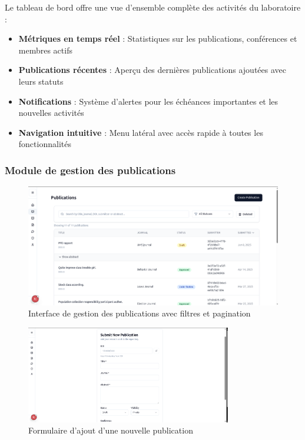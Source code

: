 \documentclass[12pt]{rapportPfe}
\begin{document}
Le tableau de bord offre une vue d'ensemble complète des activités du laboratoire :
\begin{itemize}
    \item \textbf{Métriques en temps réel} : Statistiques sur les publications, conférences et membres actifs
    \item \textbf{Publications récentes} : Aperçu des dernières publications ajoutées avec leurs statuts
    \item \textbf{Notifications} : Système d'alertes pour les échéances importantes et les nouvelles activités
    \item \textbf{Navigation intuitive} : Menu latéral avec accès rapide à toutes les fonctionnalités
\end{itemize}

\subsubsection{Module de gestion des publications}

\begin{figure}[H]
    \centering
    \includegraphics[width=1\textwidth]{diagrams/a_ss_12.png}
    \caption{Interface de gestion des publications avec filtres et pagination}
    \label{fig:publications}
\end{figure}

\begin{figure}[H]
    \centering
    \includegraphics[width=0.8\textwidth]{diagrams/a_ss_11.png}
    \caption{Formulaire d'ajout d'une nouvelle publication}
    \label{fig:add_publication}
\end{figure}
\end{document}
